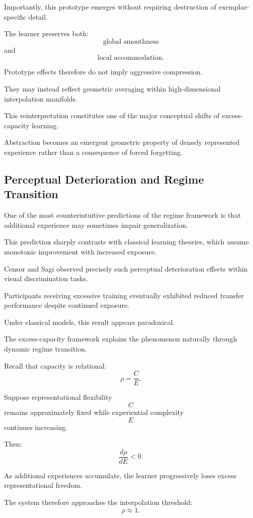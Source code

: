 \documentclass[12pt,a4paper]{article}
\begin{document}
Importantly, this prototype emerges without requiring destruction of exemplar-specific detail.

The learner preserves both:
\[
\text{global smoothness}
\]
and
\[
\text{local accommodation}.
\]

Prototype effects therefore do not imply aggressive compression.

They may instead reflect geometric averaging within high-dimensional interpolation manifolds.

This reinterpretation constitutes one of the major conceptual shifts of excess-capacity learning.

Abstraction becomes an emergent geometric property of densely represented experience rather than a consequence of forced forgetting.

\subsection{Perceptual Deterioration and Regime Transition}

One of the most counterintuitive predictions of the regime framework is that additional experience may sometimes impair generalization.

This prediction sharply contrasts with classical learning theories, which assume monotonic improvement with increased exposure.

Censor and Sagi \cite{Censor2006} observed precisely such perceptual deterioration effects within visual discrimination tasks.

Participants receiving excessive training eventually exhibited reduced transfer performance despite continued exposure.

Under classical models, this result appears paradoxical.

The excess-capacity framework explains the phenomenon naturally through dynamic regime transition.

Recall that capacity is relational:
\[
\rho
=
\frac{C}{E}.
\]

Suppose representational flexibility
\[
C
\]
remains approximately fixed while experiential complexity
\[
E
\]
continues increasing.

Then:
\[
\frac{d\rho}{dE}
<
0.
\]

As additional experiences accumulate, the learner progressively loses excess representational freedom.

The system therefore approaches the interpolation threshold:
\[
\rho \approx 1.
\]
\end{document}
